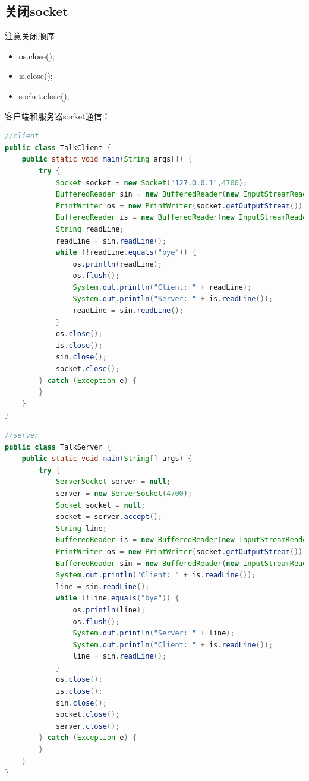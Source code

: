 \subsection{关闭socket}
注意关闭顺序
\begin{itemize}
	\item os.close();
	\item is.close();
	\item socket.close();
\end{itemize}
客户端和服务器socket通信：
\begin{lstlisting}[language=java]
//client
public class TalkClient {
	public static void main(String args[]) {
		try {
			Socket socket = new Socket("127.0.0.1",4700);
			BufferedReader sin = new BufferedReader(new InputStreamReader(System.in));
			PrintWriter os = new PrintWriter(socket.getOutputStream());
			BufferedReader is = new BufferedReader(new InputStreamReader(socket.getInputStream()));
			String readLine;
			readLine = sin.readLine();
			while (!readLine.equals("bye")) {
				os.println(readLine);
				os.flush();
				System.out.println("Client: " + readLine);
				System.out.println("Server: " + is.readLine());
				readLine = sin.readLine();
			}
			os.close();
			is.close();
			sin.close();
			socket.close();
		} catch (Exception e) {
		}
	}
}
\end{lstlisting}
\begin{lstlisting}[language=java]
//server
public class TalkServer {
	public static void main(String[] args) {
		try {
			ServerSocket server = null;
			server = new ServerSocket(4700);
			Socket socket = null;
			socket = server.accept();
			String line;
			BufferedReader is = new BufferedReader(new InputStreamReader(socket.getInputStream()));
			PrintWriter os = new PrintWriter(socket.getOutputStream());
			BufferedReader sin = new BufferedReader(new InputStreamReader(System.in));
			System.out.println("Client: " + is.readLine());
			line = sin.readLine();
			while (!line.equals("bye")) {
				os.println(line);
				os.flush();
				System.out.println("Server: " + line);
				System.out.println("Client: " + is.readLine());
				line = sin.readLine();
			}
			os.close();
			is.close();
			sin.close();
			socket.close();
			server.close();
		} catch (Exception e) {
		}
	}
}
\end{lstlisting}